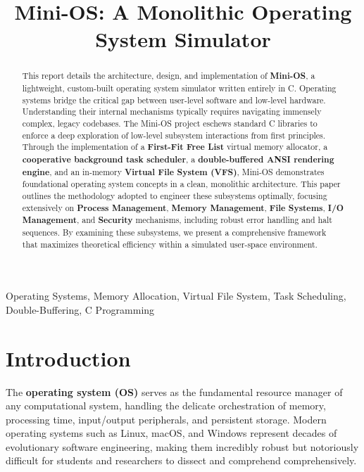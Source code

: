\documentclass[conference]{IEEEtran}
\begin{document}
\title{Mini-OS: A Monolithic Operating System Simulator}

\author{
\and
{}
\and
{}
}

\maketitle

\begin{abstract}
This report details the architecture, design, and implementation of \textbf{Mini-OS}, a lightweight, custom-built operating system simulator written entirely in C. Operating systems bridge the critical gap between user-level software and low-level hardware. Understanding their internal mechanisms typically requires navigating immensely complex, legacy codebases. The Mini-OS project eschews standard C libraries to enforce a deep exploration of low-level subsystem interactions from first principles. Through the implementation of a \textbf{First-Fit Free List} virtual memory allocator, a \textbf{cooperative background task scheduler}, a \textbf{double-buffered ANSI rendering engine}, and an in-memory \textbf{Virtual File System (VFS)}, Mini-OS demonstrates foundational operating system concepts in a clean, monolithic architecture. This paper outlines the methodology adopted to engineer these subsystems optimally, focusing extensively on \textbf{Process Management}, \textbf{Memory Management}, \textbf{File Systems}, \textbf{I/O Management}, and \textbf{Security} mechanisms, including robust error handling and halt sequences. By examining these subsystems, we present a comprehensive framework that maximizes theoretical efficiency within a simulated user-space environment.
\end{abstract}

\begin{IEEEkeywords}
Operating Systems, Memory Allocation, Virtual File System, Task Scheduling, Double-Buffering, C Programming
\end{IEEEkeywords}

\section{Introduction}
The \textbf{operating system (OS)} serves as the fundamental resource manager of any computational system, handling the delicate orchestration of memory, processing time, input/output peripherals, and persistent storage. Modern operating systems such as Linux, macOS, and Windows represent decades of evolutionary software engineering, making them incredibly robust but notoriously difficult for students and researchers to dissect and comprehend comprehensively.
\end{document}
